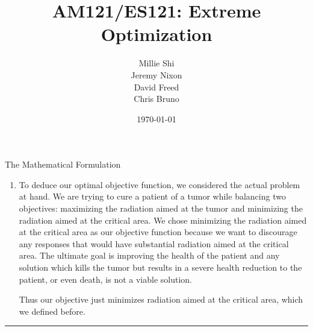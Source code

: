\documentclass[12pt]{article}
\makeatletter
\newenvironment{task}{\@startsection
       {section}{1}
       {0.4em}{-.5ex plus -1ex minus -.2ex}{.5ex plus .2ex}
       {\pagebreak[3]\large\bf\noindent{Task}}}
       {\nopagebreak[3]\vspace{3ex}\begin{center}\rule{1\linewidth}{.3pt}\end{center}}
\makeatother
\begin{document}
\title{AM121/ES121: Extreme Optimization}
\author{Millie Shi\\ Jeremy Nixon \\ David Freed \\ Chris Bruno }
\date{\today}   
\maketitle
\thispagestyle{empty}
\bigskip

\begin{task}{The Mathematical Formulation}
\begin{enumerate}
\item To deduce our optimal objective function, we considered the actual problem at hand. We are trying to cure a patient of a tumor while balancing two objectives: maximizing the radiation aimed at the tumor and minimizing the radiation aimed at the critical area. We chose minimizing the radiation aimed at the critical area as our objective function because we want to discourage any responses that would have substantial radiation aimed at the critical area. The ultimate goal is improving the health of the patient and any solution which kills the tumor but results in a severe health reduction to the patient, or even death, is not a viable solution. 

Thus our objective just minimizes radiation aimed at the critical area, which we defined before.  


\end{enumerate}
\end{task}
\end{document}
